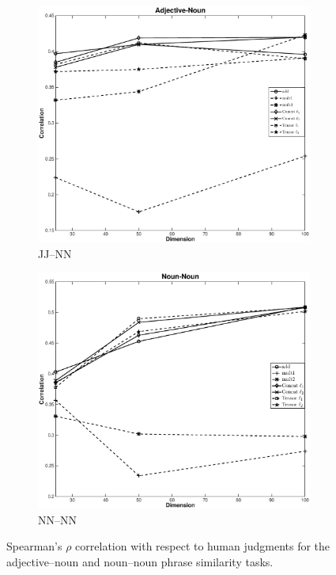 \documentclass[11pt,letterpaper]{article}
\begin{document}
\begin{figure}[t!]
	\begin{center}
	\begin{subfigure}{\columnwidth}
		\centering
		\includegraphics[width=\columnwidth,keepaspectratio=true]{./adj_nn.eps}	
		\caption{\small JJ--NN}
		\label{fig:jj_nn_result}			
	\end{subfigure}
	\begin{subfigure}{\columnwidth}
		\centering
		\includegraphics[width=\columnwidth,keepaspectratio=true]{./nn_nn.eps}		
		\caption {\small NN--NN}
		\label{fig:nn_nn_result}
	\end{subfigure}
	\end{center}
	\caption{Spearman's $\rho$ correlation with respect to human judgments for the adjective--noun and noun--noun phrase similarity tasks.}
	\label{fig:correlation}
\end{figure}
\end{document}
